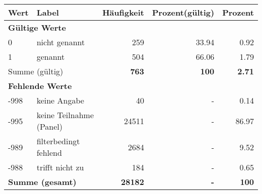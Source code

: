      \begin{longtable}{lXrrr}
     \toprule
     \textbf{Wert} & \textbf{Label} & \textbf{Häufigkeit} & \textbf{Prozent(gültig)} & \textbf{Prozent} \\
     \endhead
     \midrule
     \multicolumn{5}{l}{\textbf{Gültige Werte}}\\

     0 &
     \multicolumn{1}{X}{ nicht genannt   } &


       \num{259} &
       \num[round-mode=places,round-precision=2]{33,94} &
         \num[round-mode=places,round-precision=2]{0,92} \\

     1 &
     \multicolumn{1}{X}{ genannt   } &


       \num{504} &
       \num[round-mode=places,round-precision=2]{66,06} &
         \num[round-mode=places,round-precision=2]{1,79} \\
     \midrule
     \multicolumn{2}{l}{Summe (gültig)} &
       \textbf{\num{763}} &
     \textbf{100} &
       \textbf{\num[round-mode=places,round-precision=2]{2,71}} \\
     \multicolumn{5}{l}{\textbf{Fehlende Werte}}\\
       -998 &
       keine Angabe &
         \num{40} &
        - &
         \num[round-mode=places,round-precision=2]{0,14} \\
       -995 &
       keine Teilnahme (Panel) &
         \num{24511} &
        - &
         \num[round-mode=places,round-precision=2]{86,97} \\
       -989 &
       filterbedingt fehlend &
         \num{2684} &
        - &
         \num[round-mode=places,round-precision=2]{9,52} \\
       -988 &
       trifft nicht zu &
         \num{184} &
        - &
         \num[round-mode=places,round-precision=2]{0,65} \\
     \midrule
     \multicolumn{2}{l}{\textbf{Summe (gesamt)}} &
          \textbf{\num{28182}} &
        \textbf{-} &
        \textbf{100} \\
     \bottomrule
     \end{longtable}
     
